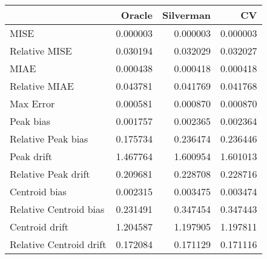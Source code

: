 \begin{tabular}{lrrr}
  \hline
 & Oracle & Silverman & CV \\ 
  \hline
MISE & 0.000003 & 0.000003 & 0.000003 \\ 
  Relative MISE & 0.030194 & 0.032029 & 0.032027 \\ 
  MIAE & 0.000438 & 0.000418 & 0.000418 \\ 
  Relative MIAE & 0.043781 & 0.041769 & 0.041768 \\ 
  Max Error & 0.000581 & 0.000870 & 0.000870 \\ 
  Peak bias & 0.001757 & 0.002365 & 0.002364 \\ 
  Relative Peak bias & 0.175734 & 0.236474 & 0.236446 \\ 
  Peak drift & 1.467764 & 1.600954 & 1.601013 \\ 
  Relative Peak drift & 0.209681 & 0.228708 & 0.228716 \\ 
  Centroid bias & 0.002315 & 0.003475 & 0.003474 \\ 
  Relative Centroid bias & 0.231491 & 0.347454 & 0.347443 \\ 
  Centroid drift & 1.204587 & 1.197905 & 1.197811 \\ 
  Relative Centroid drift & 0.172084 & 0.171129 & 0.171116 \\ 
   \hline
\end{tabular}
